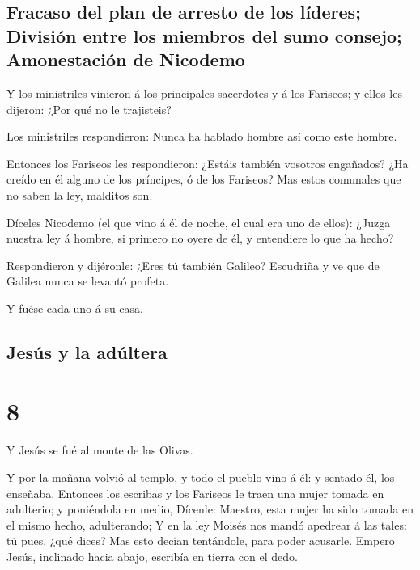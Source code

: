 \hypertarget{fracaso-del-plan-de-arresto-de-los-luxedderes-divisiuxf3n-entre-los-miembros-del-sumo-consejo-amonestaciuxf3n-de-nicodemo}{%
\subsection{Fracaso del plan de arresto de los líderes; División entre
los miembros del sumo consejo; Amonestación de
Nicodemo}\label{fracaso-del-plan-de-arresto-de-los-luxedderes-divisiuxf3n-entre-los-miembros-del-sumo-consejo-amonestaciuxf3n-de-nicodemo}}

 Y los ministriles vinieron á los principales sacerdotes
y á los Fariseos; y ellos les dijeron: ¿Por qué no le trajisteis?

 Los ministriles respondieron: Nunca ha hablado hombre
así como este hombre.

 Entonces los Fariseos les respondieron: ¿Estáis también
vosotros engañados?  ¿Ha creído en él alguno de los
príncipes, ó de los Fariseos?  Mas estos comunales que no
saben la ley, malditos son.

 Díceles Nicodemo (el que vino á él de noche, el cual era
uno de ellos):  ¿Juzga nuestra ley á hombre, si primero
no oyere de él, y entendiere lo que ha hecho?

 Respondieron y dijéronle: ¿Eres tú también Galileo?
Escudriña y ve que de Galilea nunca se levantó profeta.

 Y fuése cada uno á su casa.

\hypertarget{jesuxfas-y-la-aduxfaltera}{%
\subsection{Jesús y la adúltera}\label{jesuxfas-y-la-aduxfaltera}}

\hypertarget{section-7}{%
\section{8}\label{section-7}}

 Y Jesús se fué al monte de las Olivas.

 Y por la mañana volvió al templo, y todo el pueblo vino á
él: y sentado él, los enseñaba.  Entonces los escribas y
los Fariseos le traen una mujer tomada en adulterio; y poniéndola en
medio,  Dícenle: Maestro, esta mujer ha sido tomada en el
mismo hecho, adulterando;  Y en la ley Moisés nos mandó
apedrear á las tales: tú pues, ¿qué dices?  Mas esto
decían tentándole, para poder acusarle. Empero Jesús, inclinado hacia
abajo, escribía en tierra con el dedo.

